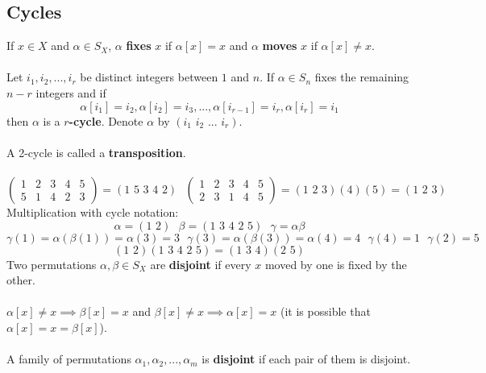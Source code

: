 \documentclass{article}
\begin{document}
\subsection{Cycles}
If \(x\in X\) and \(\alpha\in S_X\), \(\alpha\) \textbf{fixes} \(x\) if \(\alpha[x]=x\) and \(\alpha\) \textbf{moves} \(x\) if \(\alpha[x]\neq x\).\\\\
Let \(i_1, i_2, ..., i_r\) be distinct integers between \(1\) and \(n\). If \(\alpha\in S_n\) fixes the remaining \(n-r\) integers and if\\
\[\alpha[i_1]=i_2,\alpha[i_2]=i_3,...,\alpha[i_{r-1}]=i_r,\alpha[i_r]=i_1\]
then \(\alpha\) is a \textbf{\(r\)-cycle}. Denote \(\alpha\) by \((i_1\,\,i_2\,\,...\,\,i_r)\).\\\\
A 2-cycle is called a \textbf{transposition}.\\\\
\[\begin{pmatrix}1 & 2 & 3 & 4 & 5\\5 & 1 & 4 & 2 & 3\end{pmatrix}=(1\,\,5\,\,3\,\,4\,\,2)\,\,\,\,\begin{pmatrix}1 & 2 & 3 & 4 & 5\\2 & 3 & 1 & 4 & 5\end{pmatrix}=(1\,\,2\,\,3)(4)(5)=(1\,\,2\,\,3)\]
Multiplication with cycle notation:\\
\[\alpha=(1\,\,2)\,\,\,\,\beta=(1\,\,3\,\,4\,\,2\,\,5)\,\,\,\,\gamma=\alpha\beta\]
\[\gamma(1)=\alpha(\beta(1))=\alpha(3)=3\,\,\,\,\gamma(3)=\alpha(\beta(3))=\alpha(4)=4\,\,\,\,\gamma(4)=1\,\,\,\,\gamma(2)=5\]
\[(1\,\,2)(1\,\,3\,\,4\,\,2\,\,5)=(1\,\,3\,\,4)(2\,\,5)\]
Two permutations \(\alpha,\beta\in S_X\) are \textbf{disjoint} if every \(x\) moved by one is fixed by the other.\\\\
\(\alpha[x]\neq x\implies\beta[x]=x\) and \(\beta[x]\neq x\implies\alpha[x]=x\) (it is possible that \(\alpha[x]=x=\beta[x]\)).\\\\
A family of permutations \(\alpha_1,\alpha_2,...,\alpha_m\) is \textbf{disjoint} if each pair of them is disjoint.\\\\
\end{document}
